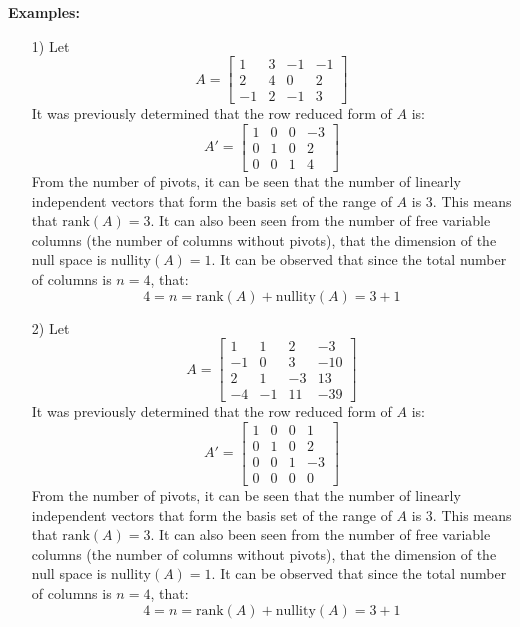 \documentclass{article}
\begin{document}
\textbf{Examples:}
\begin{itemize}
\item[1)] Let \[A = \begin{bmatrix}
  1 & 3 &  -1 &  -1 \\
  2 & 4 &   0 &   2 \\
-1 &  2 & -1 &   3 
\end{bmatrix}\]
It was previously determined that the row reduced form of \(A\) is:
\[A' = \begin{bmatrix}
1 & 0 & 0 & -3 \\
0 & 1 & 0 &  2 \\
0 & 0 & 1 &  4 
\end{bmatrix}\]
From the number of pivots, it can be seen that the number of linearly independent vectors that form the basis set of the range of \(A\) is \(3\). This means that \(\text{rank}(A) = 3\). It can also been seen from the number of free variable columns (the number of columns without pivots), that the dimension of the null space is \(\text{nullity}(A) = 1\). It can be observed that since the total number of columns is \(n = 4\), that:
\[4 = n = \text{rank}(A) + \text{nullity}(A) = 3 + 1\] 
\item[2)] Let \[A = \begin{bmatrix}
 1 &   1 &  2  &  -3 \\
-1 &   0 &  3 & -10 \\
 2 &   1 & -3 &  13 \\
-4 & -1 & 11 & -39
\end{bmatrix}\]
It was previously determined that the row reduced form of \(A\) is:
\[A' = \begin{bmatrix}
1 & 0 & 0 &  1 \\
0 & 1 & 0 &  2 \\
0 & 0 & 1 & -3 \\
0 & 0 & 0 &  0
\end{bmatrix}\]
From the number of pivots, it can be seen that the number of linearly independent vectors that form the basis set of the range of \(A\) is \(3\). This means that \(\text{rank}(A) = 3\). It can also been seen from the number of free variable columns (the number of columns without pivots), that the dimension of the null space is \(\text{nullity}(A) = 1\). It can be observed that since the total number of columns is \(n = 4\), that:
\[4 = n = \text{rank}(A) + \text{nullity}(A) = 3 + 1\] 

\end{itemize}
\end{document}
